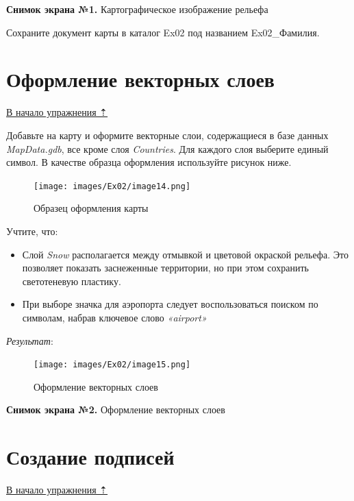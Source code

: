 \documentclass[12pt,]{book}
\begin{document}
\textbf{Снимок экрана №1.} Картографическое изображение рельефа

Сохраните документ карты в каталог Ex02 под названием Ex02\_Фамилия.

\hypertarget{map-design-general-vector}{%
\section{Оформление векторных слоев}\label{map-design-general-vector}}

\protect\hyperlink{map-design-general}{В начало упражнения ⇡}

Добавьте на карту и оформите векторные слои, содержащиеся в базе данных \emph{MapData.gdb}, все кроме слоя \emph{Countries}. Для каждого слоя выберите единый символ. В качестве образца оформления используйте рисунок ниже.

\begin{figure}
\centering
\texttt{[image: images/Ex02/image14.png]}
\caption{Образец оформления карты}
\end{figure}

Учтите, что:

\begin{itemize}
\item
  Слой \emph{Snow} располагается между отмывкой и цветовой окраской рельефа. Это позволяет показать заснеженные территории, но при этом сохранить светотеневую пластику.
\item
  При выборе значка для аэропорта следует воспользоваться поиском по символам, набрав ключевое слово \emph{«airport»}
\end{itemize}

\emph{Результат}:

\begin{figure}
\centering
\texttt{[image: images/Ex02/image15.png]}
\caption{Оформление векторных слоев}
\end{figure}

\textbf{Снимок экрана №2.} Оформление векторных слоев

\hypertarget{map-design-general-labels}{%
\section{Создание подписей}\label{map-design-general-labels}}

\protect\hyperlink{map-design-general}{В начало упражнения ⇡}
\end{document}
